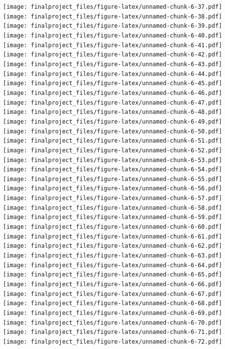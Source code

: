 \documentclass[
]{article}
\begin{document}
\texttt{[image: finalproject\_files/figure-latex/unnamed-chunk-6-37.pdf]}
\texttt{[image: finalproject\_files/figure-latex/unnamed-chunk-6-38.pdf]}
\texttt{[image: finalproject\_files/figure-latex/unnamed-chunk-6-39.pdf]}
\texttt{[image: finalproject\_files/figure-latex/unnamed-chunk-6-40.pdf]}
\texttt{[image: finalproject\_files/figure-latex/unnamed-chunk-6-41.pdf]}
\texttt{[image: finalproject\_files/figure-latex/unnamed-chunk-6-42.pdf]}
\texttt{[image: finalproject\_files/figure-latex/unnamed-chunk-6-43.pdf]}
\texttt{[image: finalproject\_files/figure-latex/unnamed-chunk-6-44.pdf]}
\texttt{[image: finalproject\_files/figure-latex/unnamed-chunk-6-45.pdf]}
\texttt{[image: finalproject\_files/figure-latex/unnamed-chunk-6-46.pdf]}
\texttt{[image: finalproject\_files/figure-latex/unnamed-chunk-6-47.pdf]}
\texttt{[image: finalproject\_files/figure-latex/unnamed-chunk-6-48.pdf]}
\texttt{[image: finalproject\_files/figure-latex/unnamed-chunk-6-49.pdf]}
\texttt{[image: finalproject\_files/figure-latex/unnamed-chunk-6-50.pdf]}
\texttt{[image: finalproject\_files/figure-latex/unnamed-chunk-6-51.pdf]}
\texttt{[image: finalproject\_files/figure-latex/unnamed-chunk-6-52.pdf]}
\texttt{[image: finalproject\_files/figure-latex/unnamed-chunk-6-53.pdf]}
\texttt{[image: finalproject\_files/figure-latex/unnamed-chunk-6-54.pdf]}
\texttt{[image: finalproject\_files/figure-latex/unnamed-chunk-6-55.pdf]}
\texttt{[image: finalproject\_files/figure-latex/unnamed-chunk-6-56.pdf]}
\texttt{[image: finalproject\_files/figure-latex/unnamed-chunk-6-57.pdf]}
\texttt{[image: finalproject\_files/figure-latex/unnamed-chunk-6-58.pdf]}
\texttt{[image: finalproject\_files/figure-latex/unnamed-chunk-6-59.pdf]}
\texttt{[image: finalproject\_files/figure-latex/unnamed-chunk-6-60.pdf]}
\texttt{[image: finalproject\_files/figure-latex/unnamed-chunk-6-61.pdf]}
\texttt{[image: finalproject\_files/figure-latex/unnamed-chunk-6-62.pdf]}
\texttt{[image: finalproject\_files/figure-latex/unnamed-chunk-6-63.pdf]}
\texttt{[image: finalproject\_files/figure-latex/unnamed-chunk-6-64.pdf]}
\texttt{[image: finalproject\_files/figure-latex/unnamed-chunk-6-65.pdf]}
\texttt{[image: finalproject\_files/figure-latex/unnamed-chunk-6-66.pdf]}
\texttt{[image: finalproject\_files/figure-latex/unnamed-chunk-6-67.pdf]}
\texttt{[image: finalproject\_files/figure-latex/unnamed-chunk-6-68.pdf]}
\texttt{[image: finalproject\_files/figure-latex/unnamed-chunk-6-69.pdf]}
\texttt{[image: finalproject\_files/figure-latex/unnamed-chunk-6-70.pdf]}
\texttt{[image: finalproject\_files/figure-latex/unnamed-chunk-6-71.pdf]}
\texttt{[image: finalproject\_files/figure-latex/unnamed-chunk-6-72.pdf]}
\end{document}
